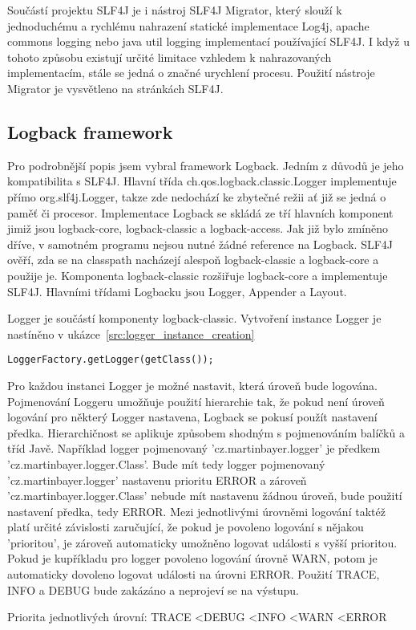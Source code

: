 \documentclass[ing,male,java,dept460]{diploma}		%
\begin{document}
\par Součástí projektu SLF4J je i nástroj SLF4J Migrator, který slouží k jednoduchému a rychlému nahrazení statické implementace Log4j, apache commons logging nebo java util logging implementací používající SLF4J. I když u tohoto způsobu existují určité limitace vzhledem k nahrazovaných implementacím, stále se jedná o značné urychlení procesu. Použití nástroje Migrator je vysvětleno na stránkách SLF4J\cite{sl4fjManual}.

\subsection{Logback framework}
Pro podrobnější popis jsem vybral framework Logback. Jedním z důvodů je jeho kompatibilita s SLF4J. Hlavní třída ch.qos.logback.classic.Logger implementuje přímo org.slf4j.Logger, takze zde nedochází ke zbytečné režii ať již se jedná o paměť či procesor. Implementace Logback se skládá ze tří hlavních komponent jimiž jsou logback-core, logback-classic a logback-access. Jak již bylo zmíněno dříve, v samotném programu nejsou nutné žádné reference na Logback. SLF4J ověří, zda se na classpath nacházejí alespoň logback-classic a logback-core a použije je. Komponenta logback-classic rozšiřuje logback-core a implementuje SLF4J. Hlavními třídami Logbacku jsou Logger, Appender a Layout.
\par Logger je součástí komponenty logback-classic. Vytvoření instance Logger je nastíněno v ukázce~\ref{src:logger_instance_creation}
\begin{lstlisting}[label=src:logger_instance_creation,caption=Vytvoření instance Logger]
	LoggerFactory.getLogger(getClass());
\end{lstlisting}
Pro každou instanci Logger je možné nastavit, která úroveň bude logována. Pojmenování Loggeru umožňuje použití hierarchie tak, že pokud není úroveň logování pro některý Logger nastavena, Logback se pokusí použít nastavení předka. Hierarchičnost se aplikuje způsobem shodným s pojmenováním balíčků a tříd Javě. Například logger pojmenovaný 'cz.martinbayer.logger' je předkem 'cz.martinbayer.logger.Class'. Bude mít tedy logger pojmenovaný 'cz.martinbayer.logger' nastavenu prioritu ERROR a zároveň 'cz.martinbayer.logger.Class' nebude mít nastavenu žádnou úroveň, bude použití nastavení předka, tedy ERROR. Mezi jednotlivými úrovněmi logování taktéž platí určité závislosti zaručující, že pokud je povoleno logování s nějakou 'prioritou', je zároveň automaticky umožněno logovat události s vyšší prioritou. Pokud je kupříkladu pro logger povoleno logování úrovně WARN, potom je automaticky dovoleno logovat události na úrovni ERROR. Použití TRACE, INFO a DEBUG bude zakázáno a neprojeví se na výstupu\cite{logbackArchitecture}.
\begin{remark}
Priorita jednotlivých úrovní: TRACE \textless DEBUG \textless INFO \textless WARN \textless ERROR
\end{remark}
\end{document}

